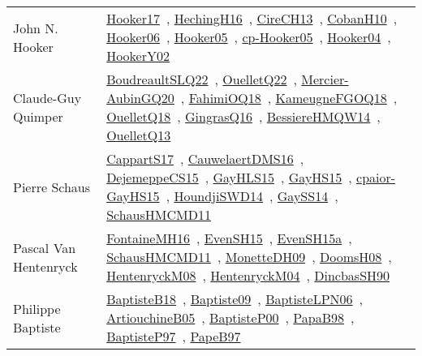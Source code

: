 {\begin{longtable}{p{4cm}p{20cm}}
John N. Hooker & \href{papers/Hooker17.pdf}{Hooker17}~\cite{Hooker17}, \href{papers/HechingH16.pdf}{HechingH16}~\cite{HechingH16}, \href{papers/CireCH13.pdf}{CireCH13}~\cite{CireCH13}, \href{papers/CobanH10.pdf}{CobanH10}~\cite{CobanH10}, \href{articles/Hooker06.pdf}{Hooker06}~\cite{Hooker06}, \href{articles/Hooker05.pdf}{Hooker05}~\cite{Hooker05}, \href{papers/cp-Hooker05.pdf}{cp-Hooker05}~\cite{cp-Hooker05}, \href{papers/Hooker04.pdf}{Hooker04}~\cite{Hooker04}, \href{papers/HookerY02.pdf}{HookerY02}~\cite{HookerY02}\\
Claude{-}Guy Quimper & \href{papers/BoudreaultSLQ22.pdf}{BoudreaultSLQ22}~\cite{BoudreaultSLQ22}, \href{papers/OuelletQ22.pdf}{OuelletQ22}~\cite{OuelletQ22}, \href{papers/Mercier-AubinGQ20.pdf}{Mercier-AubinGQ20}~\cite{Mercier-AubinGQ20}, \href{articles/FahimiOQ18.pdf}{FahimiOQ18}~\cite{FahimiOQ18}, \href{papers/KameugneFGOQ18.pdf}{KameugneFGOQ18}~\cite{KameugneFGOQ18}, \href{papers/OuelletQ18.pdf}{OuelletQ18}~\cite{OuelletQ18}, \href{papers/GingrasQ16.pdf}{GingrasQ16}~\cite{GingrasQ16}, \href{papers/BessiereHMQW14.pdf}{BessiereHMQW14}~\cite{BessiereHMQW14}, \href{papers/OuelletQ13.pdf}{OuelletQ13}~\cite{OuelletQ13}\\
Pierre Schaus & \href{papers/CappartS17.pdf}{CappartS17}~\cite{CappartS17}, \href{papers/CauwelaertDMS16.pdf}{CauwelaertDMS16}~\cite{CauwelaertDMS16}, \href{papers/DejemeppeCS15.pdf}{DejemeppeCS15}~\cite{DejemeppeCS15}, \href{papers/GayHLS15.pdf}{GayHLS15}~\cite{GayHLS15}, \href{papers/GayHS15.pdf}{GayHS15}~\cite{GayHS15}, \href{papers/cpaior-GayHS15.pdf}{cpaior-GayHS15}~\cite{cpaior-GayHS15}, \href{papers/HoundjiSWD14.pdf}{HoundjiSWD14}~\cite{HoundjiSWD14}, \href{papers/GaySS14.pdf}{GaySS14}~\cite{GaySS14}, \href{articles/SchausHMCMD11.pdf}{SchausHMCMD11}~\cite{SchausHMCMD11}\\
Pascal Van Hentenryck & \href{papers/FontaineMH16.pdf}{FontaineMH16}~\cite{FontaineMH16}, \href{papers/EvenSH15.pdf}{EvenSH15}~\cite{EvenSH15}, \href{articles/EvenSH15a.pdf}{EvenSH15a}~\cite{EvenSH15a}, \href{articles/SchausHMCMD11.pdf}{SchausHMCMD11}~\cite{SchausHMCMD11}, \href{papers/MonetteDH09.pdf}{MonetteDH09}~\cite{MonetteDH09}, \href{papers/DoomsH08.pdf}{DoomsH08}~\cite{DoomsH08}, \href{papers/HentenryckM08.pdf}{HentenryckM08}~\cite{HentenryckM08}, \href{papers/HentenryckM04.pdf}{HentenryckM04}~\cite{HentenryckM04}, \href{articles/DincbasSH90.pdf}{DincbasSH90}~\cite{DincbasSH90}\\
Philippe Baptiste & \href{articles/BaptisteB18.pdf}{BaptisteB18}~\cite{BaptisteB18}, \href{papers/Baptiste09.pdf}{Baptiste09}~\cite{Baptiste09}, \href{}{BaptisteLPN06}~\cite{BaptisteLPN06}, \href{papers/ArtiouchineB05.pdf}{ArtiouchineB05}~\cite{ArtiouchineB05}, \href{articles/BaptisteP00.pdf}{BaptisteP00}~\cite{BaptisteP00}, \href{articles/PapaB98.pdf}{PapaB98}~\cite{PapaB98}, \href{papers/BaptisteP97.pdf}{BaptisteP97}~\cite{BaptisteP97}, \href{}{PapeB97}~\cite{PapeB97}\\

\end{longtable}}
